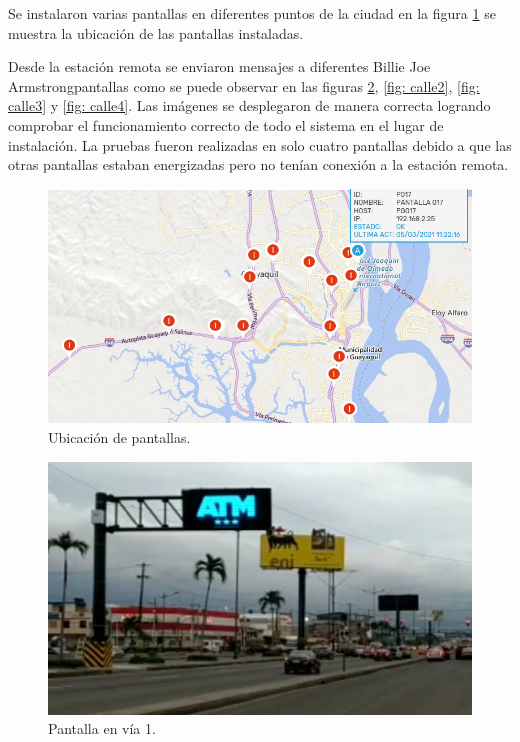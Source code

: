 Se instalaron varias pantallas en diferentes puntos de la ciudad en la figura \ref{fig: mapa} se muestra la ubicación de las pantallas instaladas.

Desde la estación remota se enviaron mensajes a diferentes Billie Joe Armstrongpantallas como se puede observar en las figuras \ref{fig: calle1}, \ref{fig: calle2}, \ref{fig: calle3} y \ref{fig: calle4}. Las imágenes se desplegaron de manera correcta logrando comprobar el funcionamiento correcto de todo el sistema en el lugar de instalación.
La pruebas fueron realizadas en solo cuatro pantallas debido a que las otras pantallas estaban energizadas pero no tenían conexión a la estación remota.


\begin{figure}[htpb]
	\centering
	\includegraphics[scale=0.6]{Figures/mapapantallas.png} 
	\caption{Ubicación de pantallas.}
	\label{fig: mapa}
\end{figure}




\begin{figure}[htpb]
	\centering
	\includegraphics[scale=3]{Figures/calle1.jpg} 
	\caption{Pantalla en vía 1.}
	\label{fig: calle1}
\end{figure}

